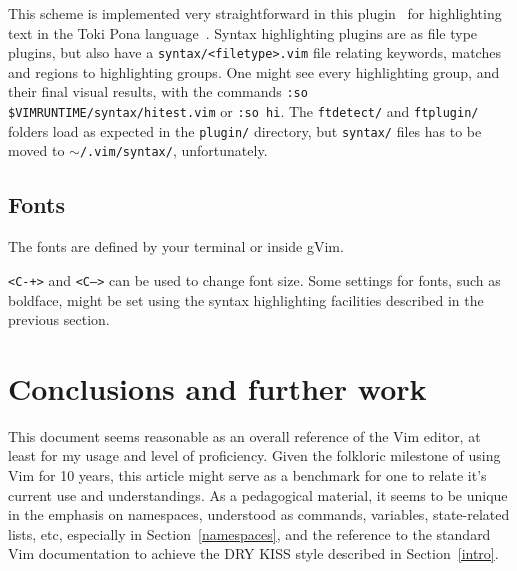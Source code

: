 \documentclass{article}
\newcommand{\ttt}[1] {
	\texttt{<#1>}}
\newcommand{\tttt}[1]{\texttt{#1}}
\begin{document}
This scheme is implemented very straightforward in this
plugin~\cite{tokipona}
for highlighting text in the Toki Pona language~\cite{tpLang}.
Syntax highlighting plugins are as file type plugins,
but also have a \tttt{syntax/<filetype>.vim} file
relating keywords, matches and regions to highlighting groups. 
One might see every highlighting group, and their final visual results,
with the commands
\tttt{:so \$VIMRUNTIME/syntax/hitest.vim}
or \tttt{:so hi}.
The \tttt{ftdetect/} and \tttt{ftplugin/} folders load as expected in the \tttt{plugin/}
directory, but \tttt{syntax/} files has to be moved to
\tttt{$\sim$/.vim/syntax/}, unfortunately.

\subsection{Fonts}
The fonts are defined by your terminal or inside gVim.
\ttt{C-+} and \ttt{C--} can be used to change font size.
Some settings for fonts, such as boldface, might be set using
the syntax highlighting facilities described in the previous section.

\section{Conclusions and further work}\label{conc}
This document seems reasonable as an overall reference of the Vim editor,
at least for my usage and level of proficiency.
Given the folkloric milestone of using Vim for 10 years,
this article might serve as a benchmark for one to relate
it's current use and understandings.
As a pedagogical material, it seems to be unique in the emphasis
on namespaces, understood as commands, variables, state-related lists, etc,
especially in Section~\ref{namespaces},
and the reference to the standard Vim documentation
to achieve the DRY KISS style described in Section~\ref{intro}.
\end{document}
